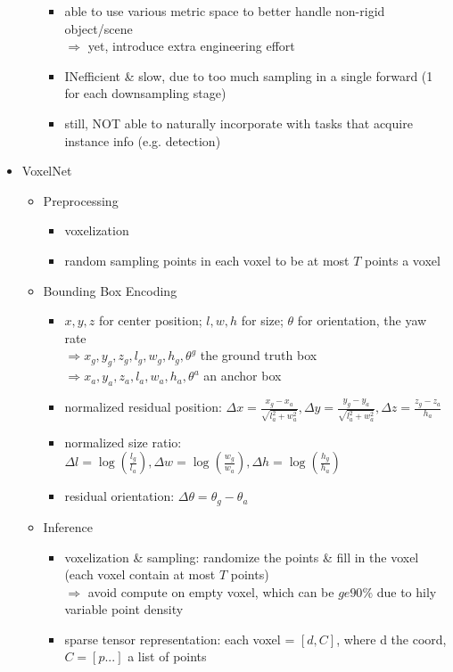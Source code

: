 \begin{itemize}
\begin{itemize}
\begin{itemize}
		\item able to use various metric space to better handle non-rigid object/scene \\
		$\Rightarrow$ yet, introduce extra engineering effort
		\item INefficient \& slow, due to too much sampling in a single forward (1 for each downsampling stage)
		\item still, NOT able to naturally incorporate with tasks that acquire instance info (e.g. detection) 
		\end{itemize}
	\end{itemize}
\item VoxelNet
	\begin{itemize}
	\item Preprocessing
		\begin{itemize}
		\item voxelization
		\item random sampling points in each voxel to be at most $T$ points a voxel
		\end{itemize}
	\item Bounding Box Encoding
		\begin{itemize}
		\item $x,y,z$ for center position; $l,w,h$ for size; $\theta$ for orientation, the yaw rate \\
		$\Rightarrow x_g,y_g,z_g,l_g,w_g,h_g,\theta^g$ the ground truth box \\
		$\Rightarrow x_a,y_a,z_a,l_a,w_a,h_a,\theta^a$ an anchor box
		\item normalized residual position: $\Delta x=\frac{x_g-x_a}{\sqrt{l_a^2+w_a^2}}, \Delta y=\frac{y_g-y_a} {\sqrt{l_a^2+w_a^2}}, \Delta z=\frac{z_g-z_a}{h_a}$
		\item normalized size ratio: $\Delta l=\log(\frac {l_g}{l_a}), \Delta w = \log(\frac{w_g}{w_a}), \Delta h=\log(\frac{h_g}{h_a})$
		\item residual orientation: $\Delta \theta = \theta_g - \theta_a$
		\end{itemize}
	\item Inference
		\begin{itemize}
		\item voxelization \& sampling: randomize the points \& fill in the voxel \\
		(each voxel contain at most $T$ points) \\
		$\Rightarrow$ avoid compute on empty voxel, which can be $ge 90\%$ due to hily variable point density
		\item sparse tensor representation: each voxel = $[d, C]$, where d the coord, $C=[p...]$ a list of points \\

\end{itemize}
\end{itemize}
\end{itemize}
